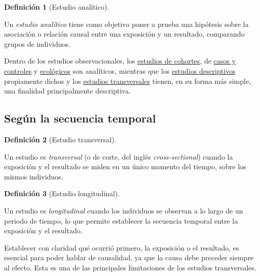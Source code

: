 \documentclass[
  spanish,
  a4paper,
]{scrreport}
\theoremstyle{definition}
\theoremstyle{definition}
\newtheorem{definition}{Definición}[chapter]
\theoremstyle{remark}
\begin{document}
\begin{definition}[Estudio
analítico]\protect\hypertarget{def-estudio-analitico}{}\label{def-estudio-analitico}

Un \emph{estudio analítico} tiene como objetivo poner a prueba una
hipótesis sobre la asociación o relación causal entre una exposición y
un resultado, comparando grupos de individuos.

\end{definition}

Dentro de los estudios observacionales, los
\href{04-estudios-cohortes.qmd}{estudios de cohortes}, de
\href{05-estudios-casos-controles.qmd}{casos y controles} y
\href{06-estudios-ecologicos.qmd}{ecológicos} son analíticos, mientras
que los \href{02-estudios-descriptivos.qmd}{estudios descriptivos}
propiamente dichos y los \href{03-estudios-transversales.qmd}{estudios
transversales} tienen, en su forma más simple, una finalidad
principalmente descriptiva.

\subsection{Según la secuencia
temporal}\label{seguxfan-la-secuencia-temporal}

\begin{definition}[Estudio
transversal]\protect\hypertarget{def-estudio-transversal-temporal}{}\label{def-estudio-transversal-temporal}

Un estudio es \emph{transversal} (o de corte, del inglés
\emph{cross-sectional}) cuando la exposición y el resultado se miden en
un único momento del tiempo, sobre los mismos individuos.

\end{definition}

\begin{definition}[Estudio
longitudinal]\protect\hypertarget{def-estudio-longitudinal}{}\label{def-estudio-longitudinal}

Un estudio es \emph{longitudinal} cuando los individuos se observan a lo
largo de un periodo de tiempo, lo que permite establecer la secuencia
temporal entre la exposición y el resultado.

\end{definition}

Establecer con claridad qué ocurrió primero, la exposición o el
resultado, es esencial para poder hablar de causalidad, ya que la causa
debe preceder siempre al efecto. Esta es una de las principales
limitaciones de los estudios transversales.
\end{document}
